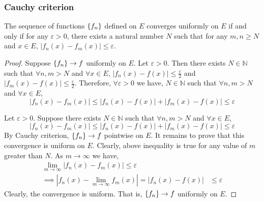 \subsubsection{Cauchy criterion}
\begin{theorem}
	The sequence of functions $\{f_n\}$ defined on $E$ converges uniformly on $E$ if and only if for any $\varepsilon > 0$, there exists a natural number $N$ such that for any $m,n \ge N$ and $x \in E$, $|f_n(x)-f_m(x)| \le \varepsilon$.
\end{theorem}
\begin{proof}
	Suppose $\{f_n\} \to f$ uniformly on $E$.
	Let $\varepsilon > 0$.
	Then there exists $N \in \mathbb{N}$ such that $\forall n,m > N$ and $\forall x \in E$, $|f_n(x) - f(x)| \le \frac{\varepsilon}{2}$ and $|f_m(x)-f(x)| \le \frac{\varepsilon}{2}$.
	Therefore, $\forall \varepsilon > 0$ we have, $N \in \mathbb{N}$ such that $\forall n,m > N$ and $\forall x \in E$,
	\[ |f_n(x) - f_m(x)| \le |f_n(x)-f(x)| + |f_m(x)-f(x)| \le \varepsilon \]

	Let $\varepsilon > 0$.
	Suppose there exists $N \in \mathbb{N}$ such that $\forall n,m > N$ and $\forall x \in E$,
	\[ |f_n(x) - f_m(x)| \le |f_n(x)-f(x)| + |f_m(x)-f(x)| \le \varepsilon \]
	By Cauchy criterion, $\{f_n\} \to f$ pointwise on $E$.
	It remains to prove that this convergence is uniform on $E$.
	Clearly, above inequality is true for any value of $m$ greater than $N$.
	As $m \to \infty$ we have,
	\begin{align*}
		\lim_{m \to \infty} |f_n(x) - f_m(x)|  \le \varepsilon \\
		\implies \left|f_n(x) - \lim_{m \to \infty} f_m(x)\right| = |f_n(x) - f(x) | & \le \varepsilon
	\end{align*}
	Clearly, the convergence is uniform.
	That is, $\{f_n\} \to f$ uniformly on $E$.
\end{proof}

